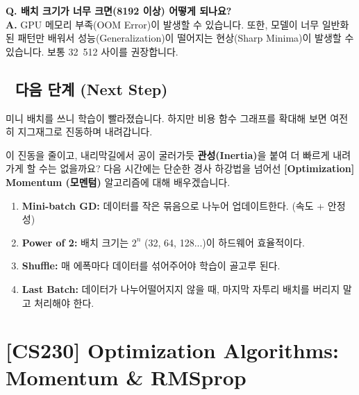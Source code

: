 \documentclass[11pt,a4paper]{book}
\theoremstyle{definition}
\begin{document}
\textbf{Q. 배치 크기가 너무 크면(8192 이상) 어떻게 되나요?} \\
\textbf{A.} GPU 메모리 부족(OOM Error)이 발생할 수 있습니다. 또한, 모델이 너무 일반화된 패턴만 배워서 성능(Generalization)이 떨어지는 현상(Sharp Minima)이 발생할 수 있습니다. 보통 32~512 사이를 권장합니다.

\section*{🔗 다음 단계 (Next Step)}
미니 배치를 쓰니 학습이 빨라졌습니다. 하지만 비용 함수 그래프를 확대해 보면 여전히 지그재그로 진동하며 내려갑니다.

이 진동을 줄이고, 내리막길에서 공이 굴러가듯 \textbf{관성(Inertia)}을 붙여 더 빠르게 내려가게 할 수는 없을까요?
다음 시간에는 단순한 경사 하강법을 넘어선 \textbf{[Optimization] Momentum (모멘텀)} 알고리즘에 대해 배우겠습니다.

\vspace{0.5cm}

\begin{summarybox}[title={단원 요약 (Cheat Sheet)}]
\begin{enumerate}
    \item \textbf{Mini-batch GD:} 데이터를 작은 묶음으로 나누어 업데이트한다. (속도 + 안정성)
    \item \textbf{Power of 2:} 배치 크기는 $2^n$ (32, 64, 128...)이 하드웨어 효율적이다.
    \item \textbf{Shuffle:} 매 에폭마다 데이터를 섞어주어야 학습이 골고루 된다.
    \item \textbf{Last Batch:} 데이터가 나누어떨어지지 않을 때, 마지막 자투리 배치를 버리지 말고 처리해야 한다.
\end{enumerate}
\end{summarybox}


\chapter{[CS230] Optimization Algorithms: \\ Momentum \& RMSprop}
\label{ch:lecture17}

\end{document}
